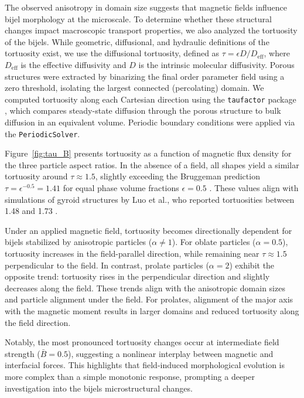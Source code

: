 The observed anisotropy in domain size suggests that magnetic fields influence bijel morphology at the microscale. To determine whether these structural 
changes impact macroscopic transport properties, we also analyzed the tortuosity of the bijels. While geometric, 
diffusional, and hydraulic definitions of the tortuosity exist, we use the diffusional tortuosity, defined as \(\tau = \epsilon D / D_{\text{eff}}\), 
where \(D_{\text{eff}}\) is the effective diffusivity and \(D\) is the intrinsic molecular diffusivity. \cite{dasilva_tortuosity_2022} Porous structures were 
extracted by binarizing the final order parameter field using a zero threshold, isolating the largest connected (percolating) domain. We computed tortuosity 
along each Cartesian direction using the \texttt{taufactor} package \cite{cooper_taufactor_2016}, which compares steady-state diffusion through the porous 
structure to bulk diffusion in an equivalent volume. Periodic boundary conditions were applied via the \texttt{PeriodicSolver}.

Figure~\ref{fig:tau_B} presents tortuosity as a function of magnetic flux density for the three particle aspect ratios. In the absence of a field, all 
shapes yield a similar tortuosity around \(\tau \approx 1.5\), slightly exceeding the Bruggeman prediction \(\tau = \epsilon^{-0.5} = 1.41\) for equal 
phase volume fractions \(\epsilon = 0.5\) \cite{bruggeman_berechnung_1935, tjaden_origin_2016}. These values align with simulations of gyroid structures 
by Luo et al., who reported tortuosities between 1.48 and 1.73 \cite{luo_macroscopic_2020}.

Under an applied magnetic field, tortuosity becomes directionally dependent for bijels stabilized by anisotropic particles (\(\alpha \neq 1\)). For oblate 
particles (\(\alpha = 0.5\)), tortuosity increases in the field-parallel direction, while remaining near \(\tau \approx 1.5\) perpendicular to the field. 
In contrast, prolate particles (\(\alpha = 2\)) exhibit the opposite trend: tortuosity rises in the perpendicular direction and slightly decreases along 
the field. These trends align with the anisotropic domain sizes and particle alignment under the field. For prolates, alignment of the major axis with the 
magnetic moment results in larger domains and reduced tortuosity along the field direction.

Notably, the most pronounced tortuosity changes occur at intermediate field strength (\(\bar{B} = 0.5\)), suggesting a nonlinear interplay between magnetic 
and interfacial forces. This highlights that field-induced morphological evolution is more complex than a simple monotonic response, prompting a deeper 
investigation into the bijels microstructural changes.
    

